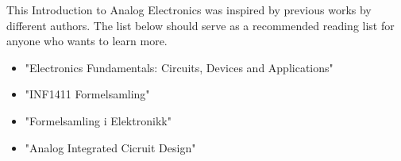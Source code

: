 This Introduction to Analog Electronics was inspired by previous works by 
different authors. The list below should serve as a recommended reading list 
for anyone who wants to learn more.
\begin{itemize}
    \item "Electronics Fundamentals: Circuits, Devices and Applications"
    \cite{fundamentals}
    \item "INF1411 Formelsamling" \cite{hagenes}
    \item "Formelsamling i Elektronikk" \cite{formulae} 
    \item "Analog Integrated Cicruit Design" \cite{analog}
\end{itemize}